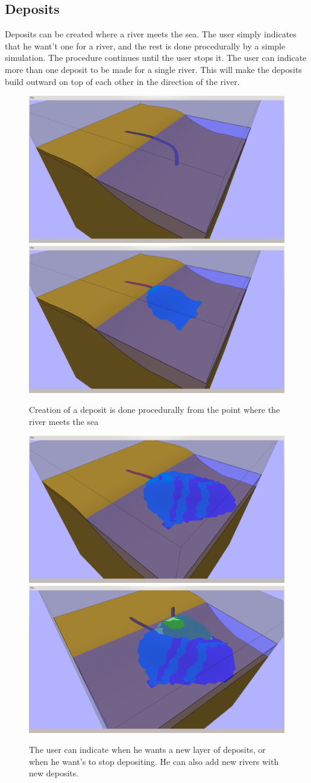 \documentclass[a4paper,12pt]{report}
\begin{document}
\subsection{Deposits}
Deposits can be created where a river meets the sea. The user simply indicates that he want't one for a river, and the rest is done procedurally by a simple simulation. The procedure continues until the user stops it. The user can indicate more than one deposit to be made for a single river. This will make the deposits build outward on top of each other in the direction of the river.

\begin{figure}
\includegraphics[trim = 90mm 7mm 80mm 30mm, clip,width=.5\linewidth]{thesis/results/depositBefore.png}
\includegraphics[trim = 90mm 7mm 80mm 30mm, clip,width=.5\linewidth]{thesis/results/depositCreated.png}
 \caption{Creation of a deposit is done procedurally from the point where the river meets the sea}
 \label{fig:seaLevel}
\end{figure}


\begin{figure}
\includegraphics[trim = 120mm 7mm 30mm 30mm, clip,width=.5\linewidth]{thesis/results/depositLayered.png}
\includegraphics[trim = 120mm 7mm 30mm 30mm, clip,width=.5\linewidth]{thesis/results/depositNew.png}
 \caption{The user can indicate when he wants a new layer of deposits, or when he want's to stop depositing. He can also add new rivers with new deposits.}
 \label{fig:seaLevel}
\end{figure}
\end{document}
